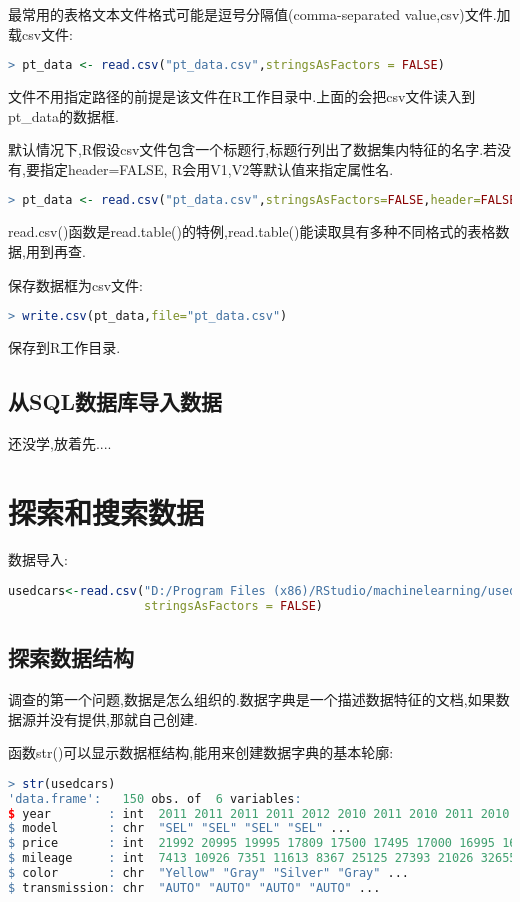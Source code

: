\documentclass[11pt,a4paper,oneside]{book}
\begin{document}
最常用的表格文本文件格式可能是逗号分隔值(comma-separated value,csv)文件.加载csv文件:
\begin{lstlisting}[language=r]
> pt_data <- read.csv("pt_data.csv",stringsAsFactors = FALSE)
\end{lstlisting}
文件不用指定路径的前提是该文件在R工作目录中.上面的会把csv文件读入到pt\_data的数据框.

默认情况下,R假设csv文件包含一个标题行,标题行列出了数据集内特征的名字.若没有,要指定header=FALSE, R会用V1,V2等默认值来指定属性名.
\begin{lstlisting}[language=r]
> pt_data <- read.csv("pt_data.csv",stringsAsFactors=FALSE,header=FALSE)
\end{lstlisting}

read.csv()函数是read.table()的特例,read.table()能读取具有多种不同格式的表格数据,用到再查.

保存数据框为csv文件:
\begin{lstlisting}[language=r]
> write.csv(pt_data,file="pt_data.csv")
\end{lstlisting}
保存到R工作目录.

\subsection{从SQL数据库导入数据}
还没学,放着先....

\section{探索和搜索数据}
数据导入:
\begin{lstlisting}[language=r]
usedcars<-read.csv("D:/Program Files (x86)/RStudio/machinelearning/usedcars.csv",
                   stringsAsFactors = FALSE)
\end{lstlisting}
\subsection{探索数据结构}
调查的第一个问题,数据是怎么组织的.数据字典是一个描述数据特征的文档,如果数据源并没有提供,那就自己创建.

函数str()可以显示数据框结构,能用来创建数据字典的基本轮廓:
\begin{lstlisting}[language=r]
> str(usedcars)
'data.frame':	150 obs. of  6 variables:
$ year        : int  2011 2011 2011 2011 2012 2010 2011 2010 2011 2010 ...
$ model       : chr  "SEL" "SEL" "SEL" "SEL" ...
$ price       : int  21992 20995 19995 17809 17500 17495 17000 16995 16995 16995 ...
$ mileage     : int  7413 10926 7351 11613 8367 25125 27393 21026 32655 36116 ...
$ color       : chr  "Yellow" "Gray" "Silver" "Gray" ...
$ transmission: chr  "AUTO" "AUTO" "AUTO" "AUTO" ...
\end{lstlisting}
\end{document}

